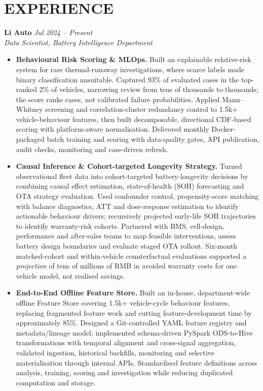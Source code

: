 \documentclass[a4paper,10pt]{article}
\begin{document}
\section{EXPERIENCE}
\textbf{Li Auto} \hfill \textit{Jul 2024 -- Present}\\
\textit{Data Scientist, Battery Intelligence Department}
\begin{itemize}
\item \textbf{Behavioural Risk Scoring \& MLOps.} Built an explainable relative-risk system for rare thermal-runaway investigations, where scarce labels made binary classification unsuitable. Captured 93\% of evaluated cases in the top-ranked 2\% of vehicles, narrowing review from tens of thousands to thousands; the score ranks cases, not calibrated failure probabilities. Applied Mann--Whitney screening and correlation-cluster redundancy control to 1.5k+ vehicle-behaviour features, then built decomposable, directional CDF-based scoring with platform-aware normalisation. Delivered monthly Docker-packaged batch training and scoring with data-quality gates, API publication, audit checks, monitoring and case-driven refresh.
\item \textbf{Causal Inference \& Cohort-targeted Longevity Strategy.} Turned observational fleet data into cohort-targeted battery-longevity decisions by combining causal effect estimation, state-of-health (SOH) forecasting and OTA strategy evaluation. Used confounder control, propensity-score matching with balance diagnostics, ATT and dose-response estimation to identify actionable behaviour drivers; recursively projected early-life SOH trajectories to identify warranty-risk cohorts. Partnered with BMS, cell-design, performance and after-sales teams to map feasible interventions, assess battery design boundaries and evaluate staged OTA rollout. Six-month matched-cohort and within-vehicle counterfactual evaluations supported a \emph{projection} of tens of millions of RMB in avoided warranty costs for one vehicle model, not realised savings.
\item \textbf{End-to-End Offline Feature Store.} Built an in-house, department-wide offline Feature Store covering 1.5k+ vehicle-cycle behaviour features, replacing fragmented feature work and cutting feature-development time by approximately 85\%. Designed a Git-controlled YAML feature registry and metadata/lineage model; implemented schema-driven PySpark ODS-to-Hive transformations with temporal alignment and cross-signal aggregation, validated ingestion, historical backfills, monitoring and selective materialisation through internal APIs. Standardised feature definitions across analysis, training, scoring and investigation while reducing duplicated computation and storage.

\end{itemize}
\end{document}
